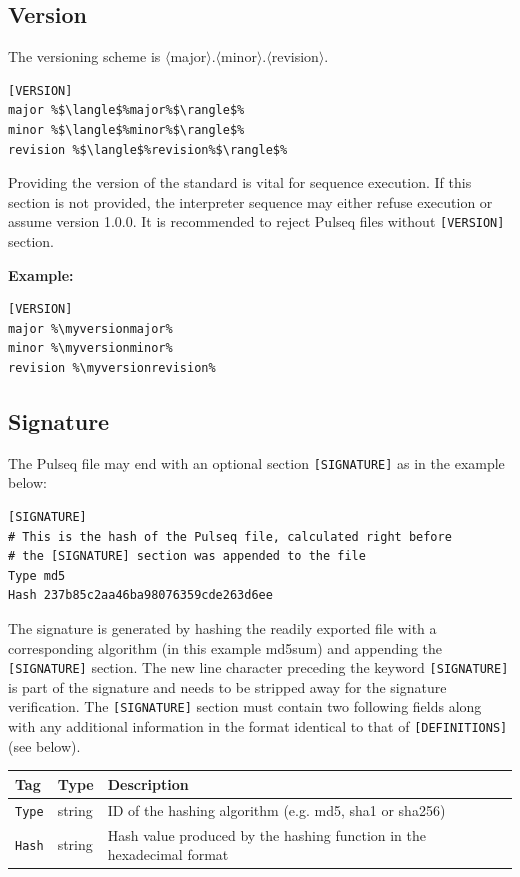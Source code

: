 \documentclass{article}
\def\myversionmajor{1}
\def\myversionminor{5}
\def\myversionrevision{0}
\begin{document}
\subsection{Version}

The versioning scheme is $\langle$major$\rangle$.$\langle$minor$\rangle$.$\langle$revision$\rangle$.

\begin{lstlisting}[escapechar=\%]
[VERSION]
major %$\langle$%major%$\rangle$%
minor %$\langle$%minor%$\rangle$%
revision %$\langle$%revision%$\rangle$%
\end{lstlisting}

Providing the version of the standard is vital for sequence execution.
If this section is not provided, the interpreter sequence may either refuse execution or assume version 1.0.0. It is recommended to reject Pulseq files without \verb.[VERSION]. section.

\textbf{Example:}
\begin{lstlisting}[escapechar=\%]
[VERSION]
major %\myversionmajor%
minor %\myversionminor%
revision %\myversionrevision%
\end{lstlisting}

\subsection{Signature}

The Pulseq file may end with an optional section \verb.[SIGNATURE]. as in the example below:

\begin{lstlisting}[escapechar=\%]
[SIGNATURE]
# This is the hash of the Pulseq file, calculated right before 
# the [SIGNATURE] section was appended to the file
Type md5
Hash 237b85c2aa46ba98076359cde263d6ee
\end{lstlisting}

The signature is generated by hashing the readily exported file with a corresponding algorithm (in this example md5sum) and appending the \verb.[SIGNATURE]. section. The new line character preceding the keyword \verb.[SIGNATURE]. is part of the signature and needs to be stripped away for the signature verification. The \verb.[SIGNATURE]. section must contain two following fields along with any additional information in the format identical to that of \verb.[DEFINITIONS]. (see below). 

\begin{tabularx}{\textwidth}{llX}
\toprule
Tag & Type & Description\\
\midrule
\verb.Type. & string & ID of the hashing algorithm (e.g. md5, sha1 or sha256) \\
\verb.Hash. & string & Hash value produced by the hashing function in the hexadecimal format \\
\bottomrule
\end{tabularx}
\end{document}
